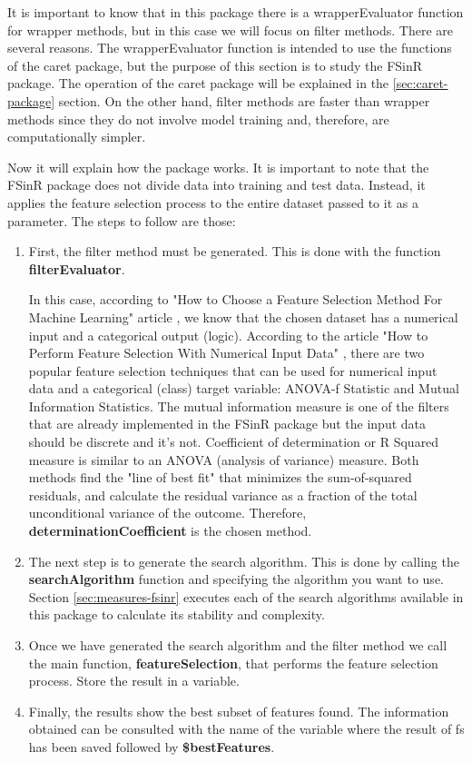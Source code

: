 It is important to know that in this package there is a wrapperEvaluator function for wrapper methods, but in this case we will focus on filter methods. There are several reasons. The wrapperEvaluator function is intended to use the functions of the \acrshort{caret} package, but the purpose of this section is to study the FSinR package. The operation of the \acrshort{caret} package will be explained in the \ref{sec:caret-package} section. On the other hand, filter methods are faster than wrapper methods since they do not involve model training and, therefore, are computationally simpler.

Now it will explain how the package works. It is important to note that the FSinR package does not divide data into training and test data. Instead, it applies the feature selection process to the entire dataset passed to it as a parameter. The steps to follow are those:

\begin{enumerate}
    \item First, the filter method must be generated. This is done with the function \textbf{filterEvaluator}.

    In this case, according to "How to Choose a Feature Selection Method For Machine Learning" article \cite{fs-method-ml}, we know that the chosen dataset has a numerical input and a categorical output (logic). According to the article "How to Perform Feature Selection With Numerical Input Data" \cite{fs-numerical}, there are two popular feature selection techniques that can be used for numerical input data and a categorical (class) target variable: ANOVA-f Statistic and Mutual Information Statistics. The mutual information measure is one of the filters that are already implemented in the FSinR package but the input data should be discrete and it's not. Coefficient of determination or R Squared measure is similar to an ANOVA (analysis of variance) measure. Both methods find the "line of best fit" that minimizes the sum-of-squared residuals, and calculate the residual variance as a fraction of the total unconditional variance of the outcome. Therefore, \textbf{determinationCoefficient} is the chosen method.
    
    \item The next step is to generate the search algorithm. This is done by calling the \textbf{searchAlgorithm} function and specifying the algorithm you want to use. Section \ref{sec:measures-fsinr} executes each of the search algorithms available in this package to calculate its stability and complexity.
    
    \item Once we have generated the search algorithm and the filter method we call the main function, \textbf{featureSelection}, that performs the feature selection process. Store the result in a variable.
    
    \item Finally, the results show the best subset of features found. The information obtained can be consulted with the name of the variable where the result of \acrshort{fs} has been saved followed by \textbf{\$bestFeatures}.
\end{enumerate}


